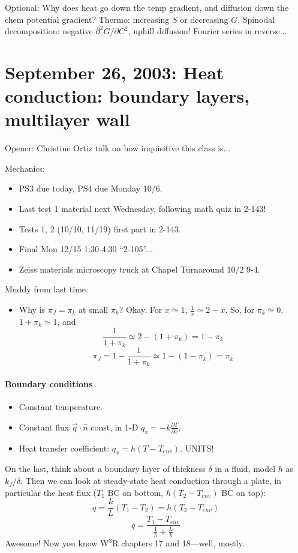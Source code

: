 \documentclass{report}
\begin{document}
Optional: Why does heat go down the temp gradient, and diffusion down the chem
potential gradient?  Thermo: increasing $S$ or decreasing $G$.  Spinodal
decomposition: negative $\partial^2G/\partial C^2$, uphill diffusion!  Fourier
series in reverse...
\newpage


\section{September 26, 2003: Heat conduction: boundary layers, multilayer wall}

Opener: Christine Ortiz talk on how inquisitive this class is...

\noindent Mechanics:
\begin{itemize}
\item PS3 due today, PS4 due Monday 10/6.
\item Last test 1 material next Wednesday, following math quiz in 2-143!
\item Tests 1, 2 (10/10, 11/19) first part in 2-143.
\item Final Mon 12/15 1:30-4:30 ``2-105''...
\item Zeiss materials microscopy truck at Chapel Turnaround 10/2 9-4.
\end{itemize}

\noindent Muddy from last time:
\begin{itemize}
\item Why is $\pi_J=\pi_k$ at small $\pi_k$?  Okay.  For $x\simeq 1$,
  $\frac{1}{x}\simeq 2-x$.  So, for $\pi_k\simeq 0$, $1+\pi_k\simeq 1$, and
  $$\frac{1}{1+\pi_k}\simeq2-(1+\pi_k)=1-\pi_k$$
  $$\pi_J = 1-\frac{1}{1+\pi_k} \simeq 1-(1-\pi_k) = \pi_k$$
\end{itemize}

\paragraph{Boundary conditions}
\begin{itemize}
\item Constant temperature.
\item Constant flux $\vec{q} \cdot \hat{n}$ const, in 1-D $q_x =
  -k\frac{\partial T}{\partial x}$.
\item Heat transfer coefficient: $q_x = h (T-T_{env})$.  UNITS!
\end{itemize}

On the last, think about a boundary layer of thickness $\delta$ in a fluid,
model $h$ as $k_f/\delta$.  Then we can look at steady-state heat conduction
through a plate, in particular the heat flux ($T_1$ BC on bottom,
$h(T_2-T_{env})$ BC on top):
$$q = \frac{k}{L}(T_1-T_2) = h (T_2-T_{env})$$
$$q = \frac{T_1-T_{env}}{\frac{1}{h} + \frac{L}{k}}$$
Awesome!  Now you know W$^3$R chapters 17 and 18---well, mostly.
\end{document}
